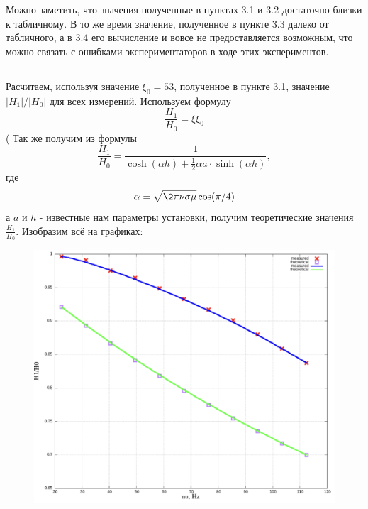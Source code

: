 \documentclass[11pt]{article}
\begin{document}
Можно заметить, что значения полученные в пунктах 3.1 и 3.2 достаточно близки к табличному.
В то же время значение, полученное в пункте 3.3 далеко от табличного, а в 3.4 его вычисление
и вовсе не предоставляется возможным, что можно связать с ошибками экспериментаторов в ходе этих экспериментов.

\subsection{}
Расчитаем, используя значение \(\xi_0 = 53\), полученное в пункте 3.1, значение \(|H_1|/|H_0|\) для всех измерений.
Используем формулу
\[\frac{H_1}{H_0} = \xi\xi_0\]
(
Так же получим из формулы
\[ \frac{H_1}{H_0} = \frac{1}{\cosh(\alpha h) + \frac{1}{2}\alpha a\cdot\sinh(\alpha h)}, \]
где 
\[ \alpha = \sqrt{\2\pi\nu\sigma\mu}\cos(\pi/4) \]
а \(a\) и \(h\) - известные нам параметры установки, получим теоретические значения \(\frac{H_1}{H_0}\). 
Изобразим всё на графиках:

\begin{figure}[H]
    \centering
    \includegraphics[width=1\textwidth]{H-low.png}
    \label{H-low}
\end{figure}
\end{document}
